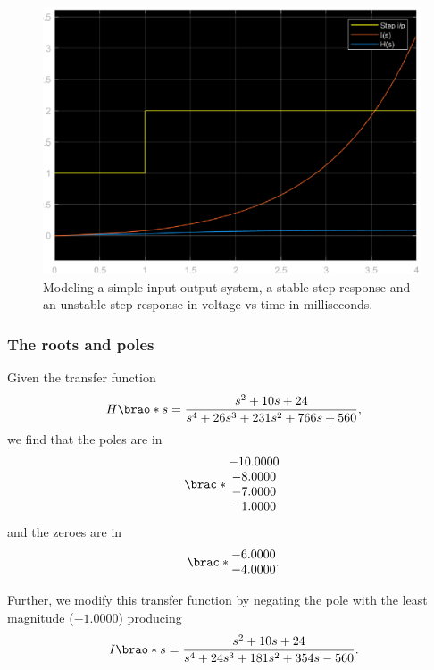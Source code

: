 \documentclass[12pt]{article}
\DeclarePairedDelimiter\brao()%
\DeclarePairedDelimiter\brac[]%
\begin{document}
\begin{figure}
    \centering
    \includegraphics[width=\linewidth]{transfer_functions.eps}
    \caption{Modeling a simple input-output system, a stable step response and an unstable step response in voltage vs time in milliseconds.}
    \label{fig:transfer functions}
\end{figure}

\subsubsection{The roots and poles}

Given the transfer function 
\[
    H\brao*s = \frac{s^2 + 10s + 24}{s^4 + 26s^3 + 231s^2 + 766s + 560}\rlap,
\]
we find that the poles are in
\[
    \brac*{
        \begin{matrix}
            -10.0000 \\*
            -8.0000 \\*
            -7.0000 \\*
            -1.0000 \\*
        \end{matrix}
    }
\]
and the zeroes are in
\[
    \brac*{
        \begin{matrix}
            -6.0000 \\*
            -4.0000 \\*
        \end{matrix}
    }\rlap.
\]

Further, we modify this transfer function by negating the pole with the least magnitude ($-1.0000$) producing
\[
    I\brao*s = \frac{s^2 + 10 s + 24}{s^4 + 24 s^3 + 181 s^2 + 354 s - 560}\rlap.
\]
\end{document}
